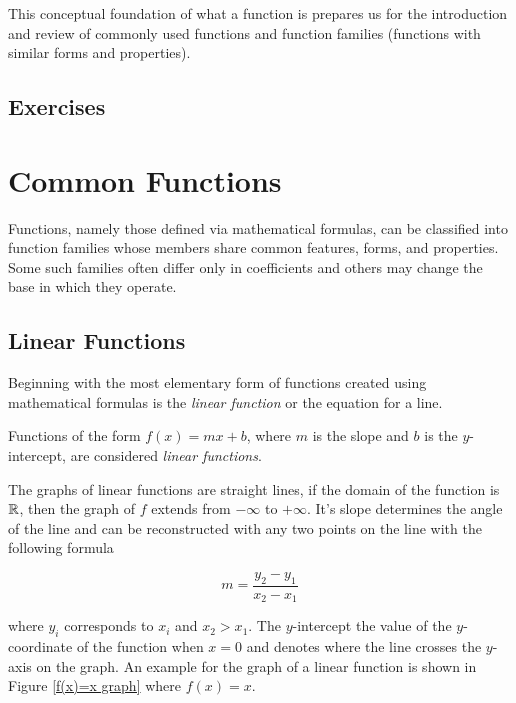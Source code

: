 This conceptual foundation of what a  function is prepares us for the introduction and review of commonly used functions and function families (functions with similar forms and properties).

\subsection{Exercises}

\section{Common Functions}
Functions, namely those defined via mathematical formulas, can be classified into function families whose members share common features, forms, and properties. Some such families often differ only in coefficients and others may change the base in which they operate.

\subsection{Linear Functions}
Beginning with the most elementary form of functions created using mathematical formulas is the \textit{linear function} or the equation for a line.

\begin{definition}
    Functions of the form $f(x) = mx + b$, where $m$ is the slope and $b$ is the $y$-intercept, are considered \textit{linear functions}.
\end{definition}

The graphs of linear functions are straight lines, if the domain of the function is $\mathbb{R}$, then the graph of $f$ extends from $-\infty$ to $+\infty$. It's slope determines the angle of the line and can be reconstructed with any two points on the line with the following formula

\begin{equation}
    m = \frac{y_2-y_1}{x_2-x_1}
    \label{slopeofaline}
\end{equation}

\noindent where $y_i$ corresponds to $x_i$ and $x_2 > x_1$. The $y$-intercept the value of the $y$-coordinate of the function when $x=0$ and denotes where the line crosses the $y$-axis on the graph. An example for the graph of a linear function is shown in Figure \ref{f(x)=x graph} where $f(x) = x$.


